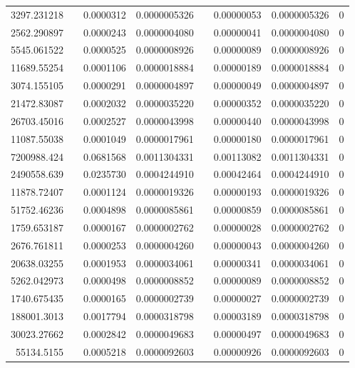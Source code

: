 \documentclass[
journal=jacsat, %
manuscript=article]{achemso}
\begin{document}
\begin{table}[htbp]
{\begin{tabular}{rrrrrrrr}
    3297.231218 &       & 0.0000312 & 0.0000005326 &       & 0.00000053 & 0.0000005326 & 0 \\
    2562.290897 &       & 0.0000243 & 0.0000004080 &       & 0.00000041 & 0.0000004080 & 0 \\
    5545.061522 &       & 0.0000525 & 0.0000008926 &       & 0.00000089 & 0.0000008926 & 0 \\
    11689.55254 &       & 0.0001106 & 0.0000018884 &       & 0.00000189 & 0.0000018884 & 0 \\
    3074.155105 &       & 0.0000291 & 0.0000004897 &       & 0.00000049 & 0.0000004897 & 0 \\
    21472.83087 &       & 0.0002032 & 0.0000035220 &       & 0.00000352 & 0.0000035220 & 0 \\
    26703.45016 &       & 0.0002527 & 0.0000043998 &       & 0.00000440 & 0.0000043998 & 0 \\
    11087.55038 &       & 0.0001049 & 0.0000017961 &       & 0.00000180 & 0.0000017961 & 0 \\
    7200988.424 &       & 0.0681568 & 0.0011304331 &       & 0.00113082 & 0.0011304331 & 0 \\
    2490558.639 &       & 0.0235730 & 0.0004244910 &       & 0.00042464 & 0.0004244910 & 0 \\
    11878.72407 &       & 0.0001124 & 0.0000019326 &       & 0.00000193 & 0.0000019326 & 0 \\
    51752.46236 &       & 0.0004898 & 0.0000085861 &       & 0.00000859 & 0.0000085861 & 0 \\
    1759.653187 &       & 0.0000167 & 0.0000002762 &       & 0.00000028 & 0.0000002762 & 0 \\
    2676.761811 &       & 0.0000253 & 0.0000004260 &       & 0.00000043 & 0.0000004260 & 0 \\
    20638.03255 &       & 0.0001953 & 0.0000034061 &       & 0.00000341 & 0.0000034061 & 0 \\
    5262.042973 &       & 0.0000498 & 0.0000008852 &       & 0.00000089 & 0.0000008852 & 0 \\
    1740.675435 &       & 0.0000165 & 0.0000002739 &       & 0.00000027 & 0.0000002739 & 0 \\
    188001.3013 &       & 0.0017794 & 0.0000318798 &       & 0.00003189 & 0.0000318798 & 0 \\
    30023.27662 &       & 0.0002842 & 0.0000049683 &       & 0.00000497 & 0.0000049683 & 0 \\
    55134.5155 &       & 0.0005218 & 0.0000092603 &       & 0.00000926 & 0.0000092603 & 0 \\

\end{tabular}}
\end{table}
\end{document}
